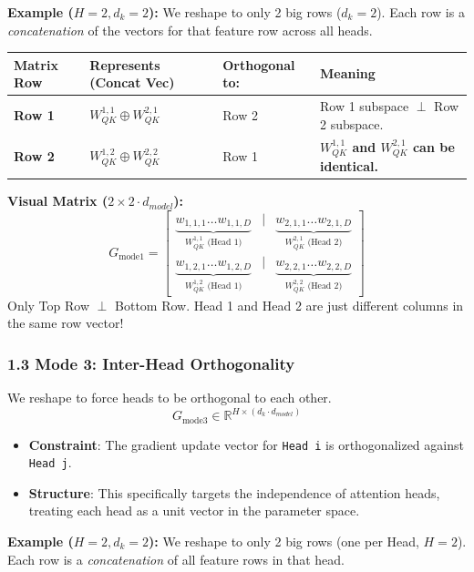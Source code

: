 \documentclass[12pt]{article}
\begin{document}
\textbf{Example ($H=2, d_k=2$):}
We reshape to only 2 big rows ($d_k=2$). Each row is a \textit{concatenation} of the vectors for that feature row across all heads.

\begin{table}[h]
\centering
\color{lighttext}
\begin{tabularx}{\textwidth}{l l l X}
\toprule
Matrix Row & Represents (Concat Vec) & Orthogonal to: & Meaning \\
\midrule
\textbf{Row 1} & $W_{QK}^{1,1} \oplus W_{QK}^{2,1}$ & Row 2 & Row 1 subspace $\perp$ Row 2 subspace. \\
\textbf{Row 2} & $W_{QK}^{1,2} \oplus W_{QK}^{2,2}$ & Row 1 & \textbf{$W_{QK}^{1,1}$ and $W_{QK}^{2,1}$ can be identical.} \\
\bottomrule
\end{tabularx}
\end{table}

\textbf{Visual Matrix ($2 \times 2 \cdot d_{model}$):}
$$
G_{\text{mode1}} = 
\begin{bmatrix}
\underbrace{w_{1,1,1} \dots w_{1,1,D}}_{W_{QK}^{1,1} \text{ (Head 1)}} & \mathbf{|} & \underbrace{w_{2,1,1} \dots w_{2,1,D}}_{W_{QK}^{2,1} \text{ (Head 2)}} \\
\underbrace{w_{1,2,1} \dots w_{1,2,D}}_{W_{QK}^{1,2} \text{ (Head 1)}} & \mathbf{|} & \underbrace{w_{2,2,1} \dots w_{2,2,D}}_{W_{QK}^{2,2} \text{ (Head 2)}}
\end{bmatrix}
$$
Only Top Row $\perp$ Bottom Row. Head 1 and Head 2 are just different columns in the same row vector!

\subsubsection*{1.3 Mode 3: Inter-Head Orthogonality}
We reshape to force heads to be orthogonal to each other.
$$G_{\text{mode3}} \in \mathbb{R}^{H \times (d_k \cdot d_{model})}$$
\begin{itemize}
    \item \textbf{Constraint}: The gradient update vector for \texttt{Head i} is orthogonalized against \texttt{Head j}.
    \item \textbf{Structure}: This specifically targets the independence of attention heads, treating each head as a unit vector in the parameter space.
\end{itemize}

\textbf{Example ($H=2, d_k=2$):}
We reshape to only 2 big rows (one per Head, $H=2$). Each row is a \textit{concatenation} of all feature rows in that head.
\end{document}
